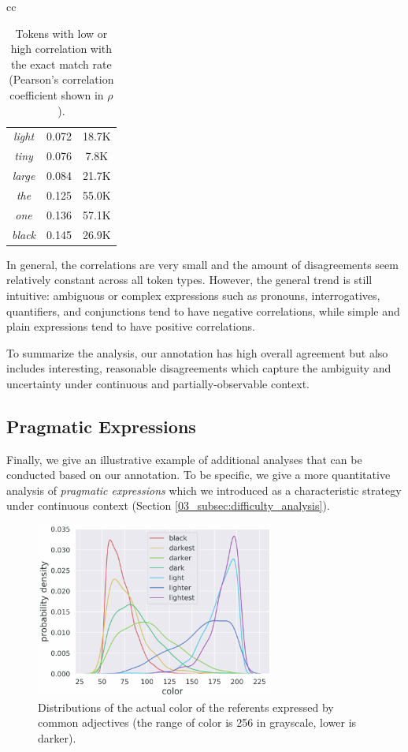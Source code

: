 \begin{table}[htb!]
{\begin{tabular}{cc}
\begin{tabular}{c|cc}
\textit{light} & 0.072 & 18.7K \\
\textit{tiny} & 0.076 & \phantom{0}7.8K \\
\textit{large} & 0.084 & 21.7K \\
\textit{the} & 0.125 & 55.0K \\
\textit{one} & 0.136 & 57.1K \\
\textit{black} & 0.145 & 26.9K \\
\bottomrule
\end{tabular}
\end{tabular}
}
\caption{\label{token_agreement_corrleation}
Tokens with low or high correlation with the exact match rate (Pearson's correlation coefficient shown in $\rho$).
}
\end{table}

In general, the correlations are very small and the amount of disagreements seem relatively constant across all token types. However, the general trend is still intuitive: ambiguous or complex expressions such as pronouns, interrogatives, quantifiers, and conjunctions tend to have negative correlations, while simple and plain expressions tend to have positive correlations.

To summarize the analysis, our annotation has high overall agreement but also includes interesting, reasonable disagreements which capture the ambiguity and uncertainty under continuous and partially-observable context.

\subsection{Pragmatic Expressions}
\label{04_subsec:pragmatic_expressions}

Finally, we give an illustrative example of additional analyses that can be conducted based on our annotation. To be specific, we give a more quantitative analysis of \textit{pragmatic expressions} which we introduced as a characteristic strategy under continuous context (Section \ref{03_subsec:difficulty_analysis}).

\begin{figure}[ht]
\centering
\includegraphics[width=0.7\textwidth]{color_distplot_cmyk.pdf}
\caption{Distributions of the actual color of the referents expressed by common adjectives (the range of color is 256 in grayscale, lower is darker).}
\label{fig:color_distplot}
\end{figure}

